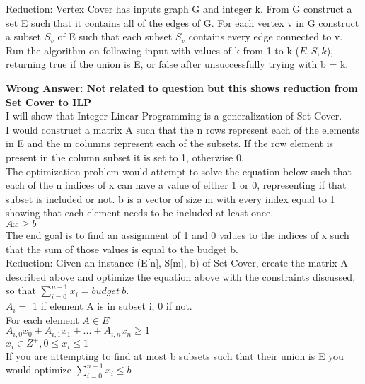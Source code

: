 \begin{questions}
\begin{parts}
\begin{solution}
      Reduction: Vertex Cover has inputs graph G and integer k. From G construct
      a set E such that it contains all of the edges of G. For each vertex v in
      G construct a subset $S_v$ of E such that each subset $S_v$ contains every
      edge connected to v. Run the algorithm on following input with values of k
      from 1 to k ($E, S, k$), returning true if the union is E, or false after
      unsuccessfully trying with b = k. 


      \textbf{\underline{Wrong Answer}: Not related to question but this shows
      reduction from Set Cover to ILP}\\
      I will show that Integer Linear Programming is a generalization of Set
      Cover.\\
      I would construct a matrix A such that the n rows represent each of the
      elements in E and the m columns represent each of the subsets. If the row
      element is present in the column subset it is set to 1, otherwise 0. \\
      The optimization problem would attempt to solve the equation below such
      that each of the n indices of x can have a value of either 1 or 0,
      representing if that subset is included or not. b is a vector of size m
      with every index equal to 1 showing that each element needs to be included
      at least once.\\
      $Ax \geq b$\\
      The end goal is to find an assignment of 1 and 0 values to the indices of
      x such that the sum of those values is equal to the budget b. \\

      Reduction: Given an instance (E[n], S[m], b) of Set Cover, create the
      matrix A described above and optimize the equation above with the
      constraints discussed, so that $\sum_{i=0}^{n-1}x_i = budget\ b$. \\
      $A_i =$ 1 if element A is in subset i, 0 if not. \\
      For each element $A \in E$\\
      $A_{i,0}x_0+A_{i,1}x_1+...+A_{i,n}x_{n} \geq 1$\\
      $x_i \in Z^+,  0 \leq x_i \leq 1$\\

      If you are attempting to find at most b subsets such that their union is E
      you would optimize $\sum_{i=0}^{n-1}x_i \leq b$
    \end{solution}


\end{parts}
\end{questions}
